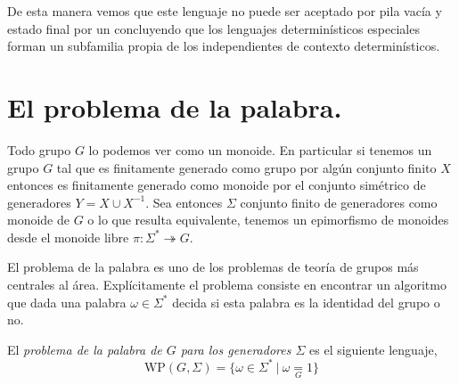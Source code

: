 \documentclass[tesis.tex]{subfiles}
\begin{document}
\begin{ej}
	De esta manera vemos que este lenguaje no puede ser aceptado por pila vacía y estado final por un \APD concluyendo que los lenguajes determinísticos especiales forman un subfamilia propia de los independientes de contexto determinísticos.
	
\end{ej}


\section{El problema de la palabra.}

Todo grupo $G$ lo podemos ver como un monoide. 
En particular si tenemos un grupo $G$ tal que es finitamente generado como grupo por algún conjunto finito $X$ entonces es finitamente generado como monoide por el conjunto simétrico de generadores $Y = X \cup X^{-1}$.
Sea entonces $\Sigma$ conjunto finito de generadores como monoide de $G$
o lo que resulta equivalente, tenemos un epimorfismo de monoides desde el monoide libre $\pi: \Sigma^* \twoheadrightarrow  G$. 

El problema de la palabra es uno de los problemas de teoría de grupos más centrales al área. Explícitamente el problema consiste en encontrar un algoritmo que dada una palabra $\omega \in \Sigma^*$ decida si esta palabra es la identidad del grupo o no. 

\begin{deff}
El \emph{problema de la palabra de $G$ para los generadores $\Sigma$} es el siguiente lenguaje,	
\[ \text{WP} (G, \Sigma) = \{ \omega \in \Sigma^* \ | \ \omega \underset{G}= 1 \}\]
\end{deff}
\end{document}
